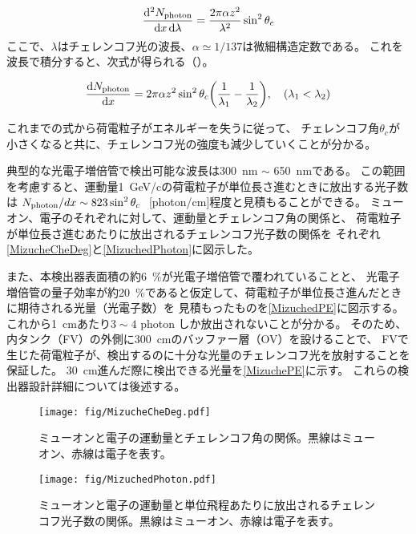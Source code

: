 \begin{equation}
\frac{\dd[2]{N_{\mathrm{photon}}}}{\dd{x} \dd{\lambda}} = \frac{2 \pi \alpha z^{2}}{\lambda^{2}} \sin^{2} \theta_{c}
\label{dNdXdL}
\end{equation}
ここで、$\lambda$はチェレンコフ光の波長、$\alpha \simeq 1/137$は微細構造定数である。
これを波長で積分すると、次式が得られる（）。

\begin{equation}
  \dv{N_{\photon}}{x} =  2 \pi \alpha z^{2} \sin^{2} \theta_{c} \pqty{ \frac{1}{\lambda_{1}}-\frac{1}{\lambda_{2}} }  \qcomma \pqty{\lambda_{1} < \lambda_{2}}
\label{dNdX}
\end{equation}

これまでの式から荷電粒子がエネルギーを失うに従って、
チェレンコフ角$\theta_{c}$が小さくなると共に、チェレンコフ光の強度も減少していくことが分かる。

典型的な光電子増倍管で検出可能な波長は\qty{300}{\nm} $\sim$ \qty{650}{\nm}である。
この範囲を考慮すると、運動量\qty{1}{\GeV/c}の荷電粒子が単位長さ進むときに放出する光子数は
$N_{\photon}/dx \sim 823\sin^{2}\theta_{c}\ $ [photon/cm]程度と見積もることができる。
ミューオン、電子のそれぞれに対して、運動量とチェレンコフ角の関係と、
荷電粒子が単位長さ進むあたりに放出されるチェレンコフ光子数の関係を
それぞれ\autoref{MizucheCheDeg}と\autoref{MizuchedPhoton}に図示した。

また、本検出器表面積の約\qty{6}{\percent}が光電子増倍管で覆われていることと、
光電子増倍管の量子効率が約\qty{20}{\percent}であると仮定して、荷電粒子が単位長さ進んだときに期待される光量（光電子数）を
見積もったものを\autoref{MizuchedPE}に図示する。
これから\qty{1}{\cm}あたり$3\sim4$ photon しか放出されないことが分かる。
そのため、内タンク（FV）の外側に\qty{300}{\cm}のバッファー層（OV）を設けることで、
FVで生じた荷電粒子が、検出するのに十分な光量のチェレンコフ光を放射することを保証した。
\qty{30}{\cm}進んだ際に検出できる光量を\autoref{MizuchePE}に示す。
これらの検出器設計詳細については後述する。

\begin{figure}[htbp]
  \begin{minipage}{0.47\textwidth}
    \centering
    \texttt{[image: fig/MizucheCheDeg.pdf]}
    \caption[ミューオンと電子の運動量とチェレンコフ角の関係]{ミューオンと電子の運動量とチェレンコフ角の関係。黒線はミューオン、赤線は電子を表す。}
    \label{MizucheCheDeg}
  \end{minipage}
  \hfill
  \begin{minipage}{0.47\textwidth}
    \centering
    \texttt{[image: fig/MizuchedPhoton.pdf]}
    \caption[ミューオンと電子の運動量と単位飛程あたりに放出されるチェレンコフ光子数の関係]{ミューオンと電子の運動量と単位飛程あたりに放出されるチェレンコフ光子数の関係。黒線はミューオン、赤線は電子を表す。}
    \label{MizuchedPhoton}
  \end{minipage}
\end{figure}

